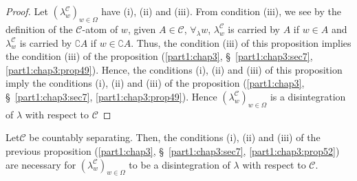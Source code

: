 \begin{proof}
Let $(\lambda^\mathscr{C}_w)_{w \in\Omega}$ have (i), (ii) and
(iii). From condition (iii), we see by the definition of the
$\mathscr{C}$-atom of $w$, given $A \in \mathscr{C}$, $\forall_\lambda
w$, $\lambda^\mathscr{C}_w$ is carried by $A$ if $w \in A$ and
$\lambda^\mathscr{C}_w$ is carried by $\complement A$ if $w
\in\complement A$. Thus, the condition (iii) of this proposition
implies the condition (iii) of the proposition (\ref{part1:chap3},
\S\ \ref{part1:chap3:sec7}, \ref{part1:chap3:prop49}). Hence, the
conditions (i), (ii) and (iii) of this proposition 
imply the conditions (i), (ii) and (iii) of the proposition (\ref{part1:chap3},
\S\ \ref{part1:chap3:sec7}, \ref{part1:chap3:prop49}). Hence
$(\lambda^\mathscr{C}_w)_{w \in \Omega}$ is a disintegration of
$\lambda$ with respect to $\mathscr{C}$ 
\end{proof}

\begin{proposition}\label{part1:chap3:prop53}
Let\pageoriginale $\mathscr{C}$ be countably separating. Then, the
conditions (i), (ii) and (iii) of the previous proposition (\ref{part1:chap3},
\S\ \ref{part1:chap3:sec7}, \ref{part1:chap3:prop52}) are necessary
for $(\lambda^\mathscr{C}_w)_{w\in\Omega}$ to be a disintegration of
$\lambda$ with respect to $\mathscr{C}$.  
\end{proposition}

